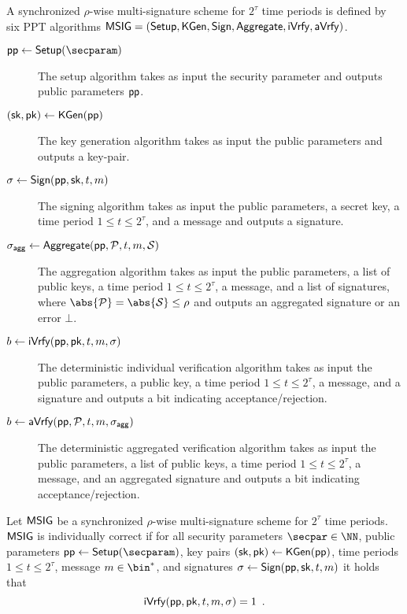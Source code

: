 \begin{definition}\label{def:multisig} A synchronized $\rho$-wise multi-signature scheme for $2^\tau$ time periods is defined by six PPT algorithms $\mathsf{MSIG}=(\mathsf{Setup}, \mathsf{KGen}, \mathsf{Sign},\allowbreak \mathsf{Aggregate},\allowbreak \mathsf{iVrfy}, \mathsf{aVrfy})$.
\begin{description}
  \item[$\params\gets\setup(\secparam)$] The setup algorithm takes as input the security parameter and outputs public parameters $\mathsf{pp}$.
  \item[$(\mathsf{sk},\mathsf{pk})\gets\mathsf{KGen}(\mathsf{pp})$] The key generation algorithm takes as input the public parameters and outputs a key-pair.
  \item[$\sigma\gets\mathsf{Sign}(\mathsf{pp},\mathsf{sk},t,m)$] The signing algorithm takes as input the public parameters, a secret key, a time period $1 \leq t \leq 2^\tau $, and a message and outputs a signature.
  \item[$\sigma_\mathsf{agg}\gets\mathsf{Aggregate}(\mathsf{pp},\mathcal{P},t,m,\mathcal{S})$] The aggregation algorithm takes as input the public parameters, a list of public keys, a time period $1 \leq t \leq 2^\tau$, a message, and a list of signatures, where $\abs{\pubkeys}=\abs{\signatures}\leq\rho$ and outputs an aggregated signature or an error $\bot$.
  \item[$b \gets \mathsf{iVrfy}(\mathsf{pp},\mathsf{pk},t,m,\sigma)$] The deterministic individual verification algorithm takes as input the public parameters, a public key, a time period $1 \leq t \leq 2^\tau $, a message, and a signature and outputs a bit indicating acceptance/rejection.
  \item[$b \gets \mathsf{aVrfy}(\mathsf{pp},\mathcal{P},t,m,\sigma_\mathsf{agg})$] The deterministic aggregated verification algorithm takes as input the public parameters, a list of public keys, a time period $1 \leq t \leq 2^\tau$, a message, and an aggregated signature and outputs a bit indicating acceptance/rejection.
\end{description}
\end{definition}

\begin{definition}
  Let $\mathsf{MSIG}$ be a synchronized $\rho$-wise multi-signature scheme for $2^\tau$ time periods.
  $\mathsf{MSIG}$ is individually correct if for all security parameters $\secpar\in\NN$, public parameters $\params\gets\setup(\secparam)$, key pairs $(\mathsf{sk},\mathsf{pk})\gets\mathsf{KGen}(\mathsf{pp})$, time periods $1 \leq t \leq 2^\tau$, message $m\in\bin^*$, and signatures $\sigma\gets\mathsf{Sign}(\mathsf{pp},\mathsf{sk},t,m)$ it holds that
  \[
    \mathsf{iVrfy}(\mathsf{pp},\mathsf{pk},t,m,\sigma) = 1\enspace.
  \]
\end{definition}

